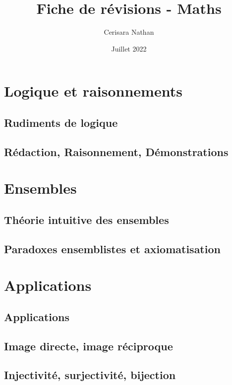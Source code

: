\documentclass[11pt,twoside,a4paper]{article}
\title{Fiche de révisions - Maths}
\author{Cerisara Nathan}
\date{Juillet 2022}
\begin{document}
\maketitle


\newpage
\tableofcontents


\newpage
\section{Logique et raisonnements}

\subsection{Rudiments de logique}

\subsection{Rédaction, Raisonnement, Démonstrations}

\newpage
\section{Ensembles}

\subsection{Théorie intuitive des ensembles}

\subsection{Paradoxes ensemblistes et axiomatisation}

\newpage
\section{Applications}

\subsection{Applications}

\subsection{Image directe, image réciproque}

\subsection{Injectivité, surjectivité, bijection}
\end{document}
